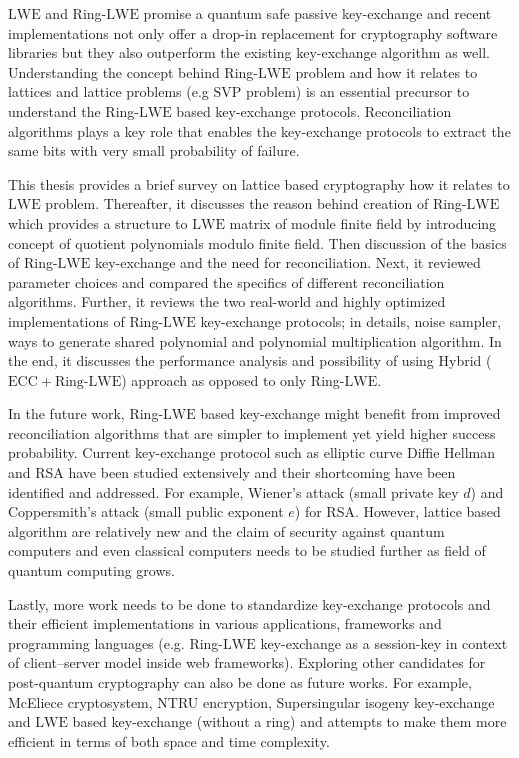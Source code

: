 $\mathrm{LWE}$ and Ring-$\mathrm{LWE}$ promise a quantum safe passive key-exchange and recent implementations not only offer a drop-in replacement for cryptography software libraries but they also outperform the existing key-exchange algorithm as well. Understanding the concept behind Ring-$\mathrm{LWE}$ problem and how it relates to lattices and lattice problems (e.g $\mathrm{SVP}$ problem) is an essential precursor to understand the Ring-$\mathrm{LWE}$ based key-exchange protocols. Reconciliation algorithms plays a key role that enables the key-exchange protocols to extract the same bits with very small probability of failure. 

This thesis provides a brief survey on lattice based cryptography how it relates to $\mathrm{LWE}$ problem. Thereafter, it discusses the reason behind creation of Ring-$\mathrm{LWE}$ which provides a structure to $\mathrm{LWE}$ matrix of module finite field by introducing concept of quotient polynomials modulo finite field. Then discussion of the basics of Ring-$\mathrm{LWE}$ key-exchange and the need for reconciliation. Next, it reviewed parameter choices and compared the specifics of different reconciliation algorithms. Further, it reviews the two real-world and highly optimized implementations of Ring-$\mathrm{LWE}$ key-exchange protocols; in details, noise sampler, ways to generate shared polynomial and polynomial multiplication algorithm. In the end, it discusses the performance analysis and possibility of using Hybrid ($\mathrm{ECC} + \text{Ring-}\mathrm{LWE}$) approach as opposed to only Ring-$\mathrm{LWE}$.


In the future work, Ring-$\mathrm{LWE}$ based key-exchange might benefit from improved reconciliation algorithms that are simpler to implement yet yield higher success probability. Current key-exchange protocol such as elliptic curve Diffie Hellman and RSA have been studied extensively and their shortcoming have been identified and addressed. For example, Wiener's attack (small private key $d$) and Coppersmith's attack (small public exponent $e$) for RSA. However, lattice based algorithm are relatively new and the claim of security against quantum computers and even classical computers needs to be studied further as field of quantum computing grows.

Lastly, more work needs to be done to standardize key-exchange protocols and their efficient implementations in various applications, frameworks and programming languages (e.g. Ring-$\mathrm{LWE}$ key-exchange as a session-key in context of client–server model inside web frameworks). Exploring other candidates for post-quantum cryptography can also be done as future works. For example, McEliece cryptosystem, NTRU encryption, Supersingular isogeny key-exchange and $\mathrm{LWE}$ based key-exchange (without a ring) and attempts to make them more efficient in terms of both space and time complexity. 
